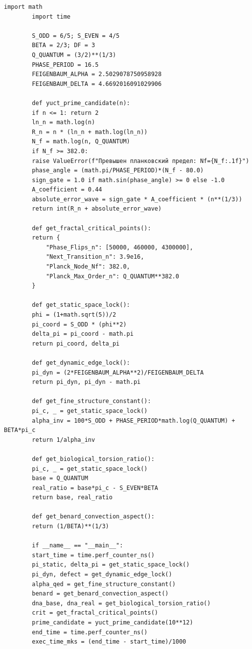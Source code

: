 \documentclass[12pt,a4paper]{article}
\begin{document}
	\begin{lstlisting}[caption={Полный координационный движок YUCT v4.0 (\texttt{yuct\_constants.py}).}, label={lst:yuct-engine}]
		import math
		import time
		
		S_ODD = 6/5; S_EVEN = 4/5
		BETA = 2/3; DF = 3
		Q_QUANTUM = (3/2)**(1/3)
		PHASE_PERIOD = 16.5
		FEIGENBAUM_ALPHA = 2.5029078750958928
		FEIGENBAUM_DELTA = 4.6692016091029906
		
		def yuct_prime_candidate(n):
		if n <= 1: return 2
		ln_n = math.log(n)
		R_n = n * (ln_n + math.log(ln_n))
		N_f = math.log(n, Q_QUANTUM)
		if N_f >= 382.0:
		raise ValueError(f"Превышен планковский предел: Nf={N_f:.1f}")
		phase_angle = (math.pi/PHASE_PERIOD)*(N_f - 80.0)
		sign_gate = 1.0 if math.sin(phase_angle) >= 0 else -1.0
		A_coefficient = 0.44
		absolute_error_wave = sign_gate * A_coefficient * (n**(1/3))
		return int(R_n + absolute_error_wave)
		
		def get_fractal_critical_points():
		return {
			"Phase_Flips_n": [50000, 460000, 4300000],
			"Next_Transition_n": 3.9e16,
			"Planck_Node_Nf": 382.0,
			"Planck_Max_Order_n": Q_QUANTUM**382.0
		}
		
		def get_static_space_lock():
		phi = (1+math.sqrt(5))/2
		pi_coord = S_ODD * (phi**2)
		delta_pi = pi_coord - math.pi
		return pi_coord, delta_pi
		
		def get_dynamic_edge_lock():
		pi_dyn = (2*FEIGENBAUM_ALPHA**2)/FEIGENBAUM_DELTA
		return pi_dyn, pi_dyn - math.pi
		
		def get_fine_structure_constant():
		pi_c, _ = get_static_space_lock()
		alpha_inv = 100*S_ODD + PHASE_PERIOD*math.log(Q_QUANTUM) + BETA*pi_c
		return 1/alpha_inv
		
		def get_biological_torsion_ratio():
		pi_c, _ = get_static_space_lock()
		base = Q_QUANTUM
		real_ratio = base*pi_c - S_EVEN*BETA
		return base, real_ratio
		
		def get_benard_convection_aspect():
		return (1/BETA)**(1/3)
		
		if __name__ == "__main__":
		start_time = time.perf_counter_ns()
		pi_static, delta_pi = get_static_space_lock()
		pi_dyn, defect = get_dynamic_edge_lock()
		alpha_qed = get_fine_structure_constant()
		benard = get_benard_convection_aspect()
		dna_base, dna_real = get_biological_torsion_ratio()
		crit = get_fractal_critical_points()
		prime_candidate = yuct_prime_candidate(10**12)
		end_time = time.perf_counter_ns()
		exec_time_mks = (end_time - start_time)/1000
		

\end{lstlisting}
\end{document}
